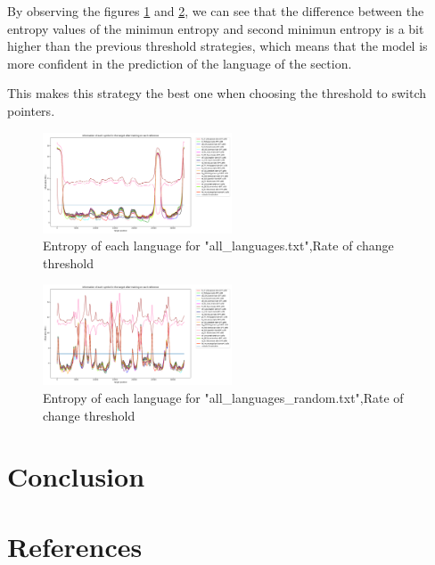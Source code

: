 \documentclass{article}
\begin{document}
By observing the figures \ref{fig:all_languages_t_c} and \ref{fig:all_languages_random_t_c}, we can see that the difference between the entropy values of the minimun entropy
and second minimun entropy is a bit higher than the previous threshold strategies, which means that the model is more confident in the prediction of the language of the section.

This makes this strategy the best one when choosing the threshold to switch pointers.

\begin{figure}
    \centering
    \includegraphics[width=0.5\textwidth]{../results/all_languages/-t_c:0.01.png}
    \caption{Entropy of each language for "all_languages.txt",Rate of change threshold}
    \label{fig:all_languages_t_c}
\end{figure}

\begin{figure}
    \centering
    \includegraphics[width=0.5\textwidth]{../results/all_languages_random/-t_c:0.01.png}
    \caption{Entropy of each language for "all_languages_random.txt",Rate of change threshold}
    \label{fig:all_languages_random_t_c}
\end{figure}

\section{Conclusion}
\label{sec:conclusion}

\section{References}


\end{document}

